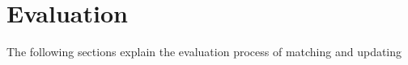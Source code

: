 \section{Evaluation}
\label{sec_evaluation}

The following sections explain the evaluation process of matching and updating


